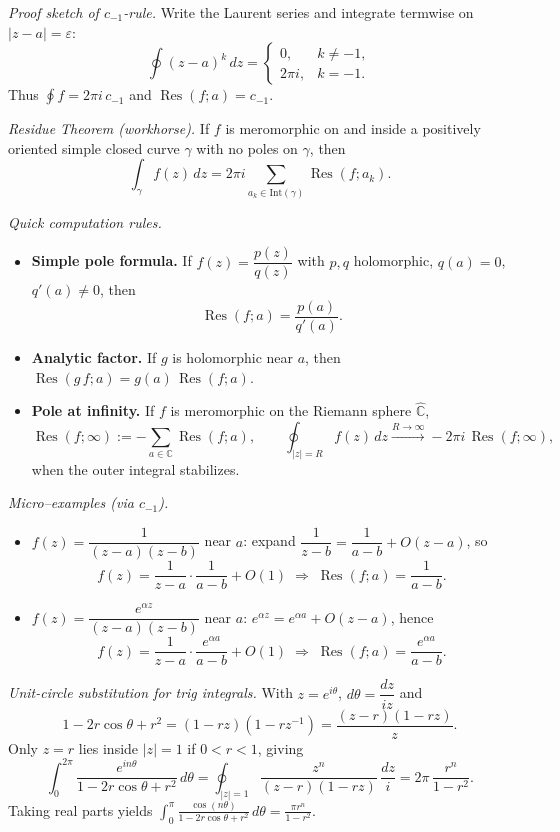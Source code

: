 \documentclass[11pt,a4paper]{article}
\theoremstyle{definition}
\theoremstyle{definition}
\theoremstyle{plain}
\theoremstyle{remark}
\DeclareMathOperator{\Res}{Res}
\begin{document}
\smallskip
\emph{Proof sketch of $c_{-1}$-rule.}
Write the Laurent series and integrate termwise on $|z-a|=\varepsilon$:
\[
\oint (z-a)^k\,dz = \begin{cases}
	0, & k\neq -1,\\[2pt]
	2\pi i, & k=-1.
\end{cases}
\]
Thus $\displaystyle \oint f = 2\pi i\,c_{-1}$ and $\Res(f;a)=c_{-1}$.

\medskip
\emph{Residue Theorem (workhorse).}
If $f$ is meromorphic on and inside a positively oriented simple closed curve $\gamma$
with no poles on $\gamma$, then
\[
\int_{\gamma} f(z)\,dz
= 2\pi i \sum_{a_k\in \mathrm{Int}(\gamma)} \Res(f;a_k).
\]

\medskip
\emph{Quick computation rules.}
\begin{itemize}
	\item \textbf{Simple pole formula.} If $f(z)=\dfrac{p(z)}{q(z)}$ with $p,q$ holomorphic,
	$q(a)=0$, $q'(a)\neq 0$, then
	\[
	\Res(f;a)=\frac{p(a)}{q'(a)}.
	\]
	\item \textbf{Analytic factor.} If $g$ is holomorphic near $a$, then
	$\Res(g\,f;a)=g(a)\,\Res(f;a)$.
	\item \textbf{Pole at infinity.} If $f$ is meromorphic on the Riemann sphere $\widehat{\mathbb C}$,
	\[
	\Res(f;\infty) := -\sum_{a\in\mathbb C}\Res(f;a),\qquad
	\oint_{|z|=R} f(z)\,dz \xrightarrow{R\to\infty} -2\pi i\,\Res(f;\infty),
	\]
	when the outer integral stabilizes.
\end{itemize}

\medskip
\emph{Micro–examples (via $c_{-1}$).}
\begin{itemize}
	\item $f(z)=\dfrac{1}{(z-a)(z-b)}$ near $a$: expand
	\(
	\dfrac{1}{z-b}=\dfrac{1}{a-b} + O(z-a)
	\),
	so
	\[
	f(z)=\frac{1}{z-a}\cdot \frac{1}{a-b} + O(1)
	\;\Rightarrow\;
	\Res(f;a)=\frac{1}{a-b}.
	\]
	\item $f(z)=\dfrac{e^{\alpha z}}{(z-a)(z-b)}$ near $a$:
	\(
	e^{\alpha z}=e^{\alpha a}+O(z-a)
	\), hence
	\[
	f(z)=\frac{1}{z-a}\cdot \frac{e^{\alpha a}}{a-b}+O(1)
	\;\Rightarrow\;
	\Res(f;a)=\frac{e^{\alpha a}}{a-b}.
	\]
\end{itemize}

\medskip
\emph{Unit-circle substitution for trig integrals.}
With $z=e^{i\theta}$, $d\theta=\dfrac{dz}{iz}$ and
\[
1-2r\cos\theta+r^2=(1-rz)(1-rz^{-1})=\frac{(z-r)(1-rz)}{z}.
\]
Only $z=r$ lies inside $|z|=1$ if $0<r<1$, giving
\[
\int_{0}^{2\pi}\frac{e^{in\theta}}{1-2r\cos\theta+r^2}\,d\theta
=\oint_{|z|=1}\frac{z^n}{(z-r)(1-rz)}\,\frac{dz}{i}
=2\pi\,\frac{r^n}{1-r^2}.
\]
Taking real parts yields
\(
\displaystyle \int_{0}^{\pi}\frac{\cos(n\theta)}{1-2r\cos\theta+r^2}\,d\theta=\frac{\pi r^n}{1-r^2}.
\)
\end{document}
